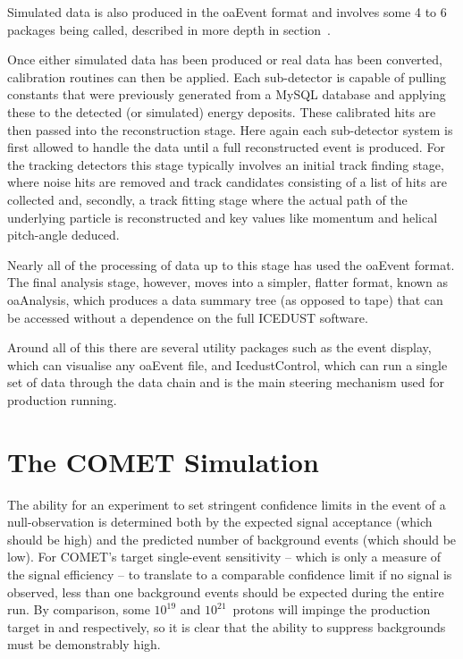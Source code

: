 Simulated data is also produced in the oaEvent format and involves some 4 to 6 packages being called, described in more depth in section~.

Once either simulated data has been produced or real data has been converted, calibration routines can then be applied.
Each sub-detector is capable of pulling constants that were previously generated from a MySQL database and applying these to the detected (or simulated) energy deposits.
These calibrated hits are then passed into the reconstruction stage.  
Here again each sub-detector system is first allowed to handle the data until a full reconstructed event is produced.
For the tracking detectors this stage typically involves an initial track finding stage, where noise hits are removed and track candidates consisting of a list of hits are collected and, secondly, a track fitting stage where the actual path of the underlying particle is reconstructed and key values like momentum and helical pitch-angle deduced.

Nearly all of the processing of data up to this stage has used the oaEvent format.
The final analysis stage, however, moves into a simpler, flatter format, known as oaAnalysis, which produces a data summary tree (as opposed to tape) that can be accessed without a dependence on the full ICEDUST software.

Around all of this there are several utility packages such as the event display, which can visualise any oaEvent file, and IcedustControl, which can run a single set of data through the data chain and is the main steering mechanism used for production running.

\section{The COMET Simulation}
The ability for an experiment to set stringent confidence limits in the event of a null-observation is determined both by the expected signal acceptance (which should be high) and the predicted number of background events (which should be low).
For COMET's target single-event sensitivity -- which is only a measure of the signal efficiency -- to translate to a comparable confidence limit if no signal is observed, less than one background events should be expected during the entire run.
By comparison, some $10^{19}$ and $10^{21}$~protons will impinge the production target in \phaseI and \phaseII respectively, so it is clear that the ability to suppress backgrounds must be demonstrably high.

